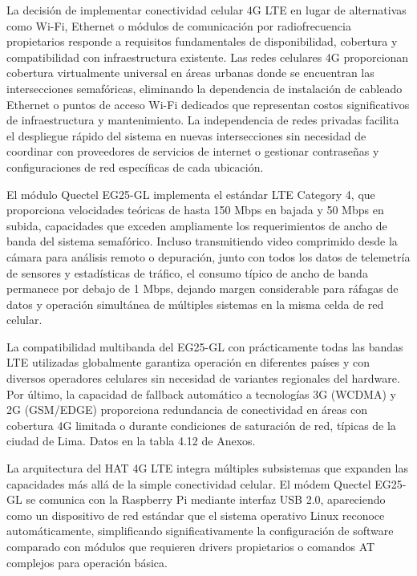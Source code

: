 \documentclass[12pt,a4paper,oneside]{report}
\begin{document}
La decisión de implementar conectividad celular 4G LTE en lugar de alternativas como Wi-Fi, Ethernet o módulos de comunicación por radiofrecuencia propietarios responde a requisitos fundamentales de disponibilidad, cobertura y compatibilidad con infraestructura existente. Las redes celulares 4G proporcionan cobertura virtualmente universal en áreas urbanas donde se encuentran las intersecciones semafóricas, eliminando la dependencia de instalación de cableado Ethernet o puntos de acceso Wi-Fi dedicados que representan costos significativos de infraestructura y mantenimiento. La independencia de redes privadas facilita el despliegue rápido del sistema en nuevas intersecciones sin necesidad de coordinar con proveedores de servicios de internet o gestionar contraseñas y configuraciones de red específicas de cada ubicación.

El módulo Quectel EG25-GL implementa el estándar LTE Category 4, que proporciona velocidades teóricas de hasta 150 Mbps en bajada y 50 Mbps en subida, capacidades que exceden ampliamente los requerimientos de ancho de banda del sistema semafórico. Incluso transmitiendo video comprimido desde la cámara para análisis remoto o depuración, junto con todos los datos de telemetría de sensores y estadísticas de tráfico, el consumo típico de ancho de banda permanece por debajo de 1 Mbps, dejando margen considerable para ráfagas de datos y operación simultánea de múltiples sistemas en la misma celda de red celular.

La compatibilidad multibanda del EG25-GL con prácticamente todas las bandas LTE utilizadas globalmente garantiza operación en diferentes países y con diversos operadores celulares sin necesidad de variantes regionales del hardware. Por último, la capacidad de fallback automático a tecnologías 3G (WCDMA) y 2G (GSM/EDGE) proporciona redundancia de conectividad en áreas con cobertura 4G limitada o durante condiciones de saturación de red, típicas de la ciudad de Lima. Datos en la tabla 4.12 de Anexos.

La arquitectura del HAT 4G LTE integra múltiples subsistemas que expanden las capacidades más allá de la simple conectividad celular. El módem Quectel EG25-GL se comunica con la Raspberry Pi mediante interfaz USB 2.0, apareciendo como un dispositivo de red estándar que el sistema operativo Linux reconoce automáticamente, simplificando significativamente la configuración de software comparado con módulos que requieren drivers propietarios o comandos AT complejos para operación básica.
\end{document}
